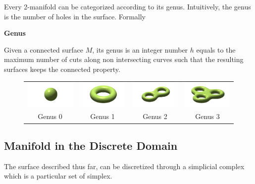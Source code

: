 Every 2-manifold can be categorized according to its genus. Intuitively, the genus is the number of holes in the surface. Formally


 
\begin{mydef}
\textbf{Genus}

Given a connected surface $M$, its genus is an integer number $h$ equals to the maximum number of cuts along non intersecting curves such that the resulting surfaces keeps the connected property.
\end{mydef}

\begin{figure}
 \begin{tabular}{cccc}
  \includegraphics[width=0.22\columnwidth]{./img/sphere}&
  \includegraphics[width=0.22\columnwidth]{./img/torus}&
  \includegraphics[width=0.22\columnwidth]{./img/doubleTorus}&
  \includegraphics[width=0.22\columnwidth]{./img/tripletorus}\\
  Genus 0 & Genus 1 & Genus 2 & Genus 3
 \end{tabular}
 
\end{figure}




\subsection{Manifold in the Discrete Domain}
The surface described thus far, can be discretized through a simplicial complex which is a particular set of simplex.

